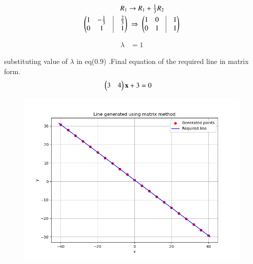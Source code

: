 \documentclass[journal]{IEEEtran}
\begin{document}
\begin{align}
R_1 &\to R_1 + \tfrac{1}{3}R_2 \\
\myvec{1 & -\tfrac{1}{3} & \vline & \tfrac{2}{3} \\ 0 & 1 & \vline & 1}
&\;\Rightarrow\;
\myvec{1 & 0 & \vline & 1 \\ 0 & 1 & \vline & 1}
\end{align}

\begin{align}
\lambda &= 1
\end{align}

substituting value of $\lambda$ in eq(0.9) .Final equation of the required line in matrix form.
\begin{align}
\begin{pmatrix}3 & 4\end{pmatrix}\mathbf{x} + 3 &= 0
\end{align}

\begin{figure}[H]
    \centering
    \includegraphics[width=0.5\columnwidth]{figs/fig1.png}
    \caption{}
    \label{fig:placeholder}
\end{figure}
\end{document}

